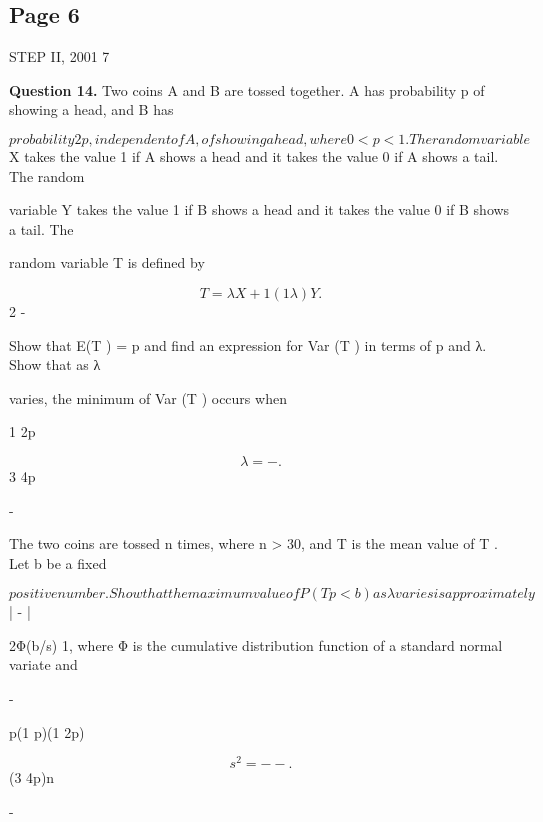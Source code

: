\documentclass[12pt]{article}
\begin{document}
\subsection*{Page 6}
\begin{flushleft}
STEP II, 2001 7\par
\bigskip\textbf{Question 14.} Two coins A and B are tossed together. A has probability p of showing a head, and B has\par
\[probability 2p, independent of A, of showing a head, where 0 < p < 1 . The random variable\]
X takes the value 1 if A shows a head and it takes the value 0 if A shows a tail. The random\par
variable Y takes the value 1 if B shows a head and it takes the value 0 if B shows a tail. The\par
random variable T is defined by\par
\[T = λX + 1 (1 λ)Y.\]
2 -\par
Show that E(T ) = p and find an expression for Var (T ) in terms of p and λ. Show that as λ\par
varies, the minimum of Var (T ) occurs when\par
1 2p\par
\[λ = - .\]
3 4p\par
-\par
The two coins are tossed n times, where n > 30, and T is the mean value of T . Let b be a fixed\par
\[positive number. Show that the maximum value of P( T p < b) as λ varies is approximately\]
| - |\par
2Φ(b/s) 1, where Φ is the cumulative distribution function of a standard normal variate and\par
-\par
p(1 p)(1 2p)\par
\[s^2 = - - .\]
(3 4p)n\par
-\par
\end{flushleft}
\end{document}
